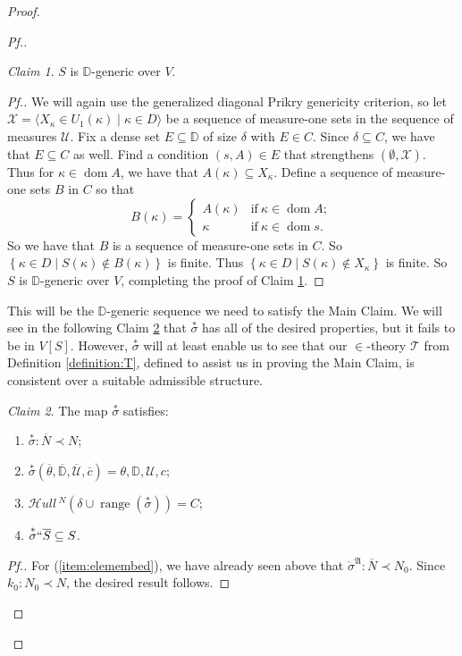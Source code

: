 \documentclass{amsart}
\theoremstyle{definition}
\theoremstyle{remark}
\newtheorem{claimno}{Claim}
\newcommand{\D}{\mathbb{D}}
\newcommand{\N}{{\overline{N}}}
\renewcommand{\S}{{\overline{S}}}
\newcommand{\U}{\mathcal{U}}
\DeclareMathOperator{\ran}{range}
\DeclareMathOperator{\dom}{dom}
\newcommand{\st}{\; | \;}
\newcommand{\set}[2]{\left\{#1\st #2 \right\}}
\newcommand{\seq}[2]{\langle #1 \st #2 \rangle}
\newcommand{\SH}{\mathcal{H}\textit{ull} \,}
\newcommand{\sk}[3]{\SH^{#1}( {#2} \cup {\ran(#3)} ) }
\begin{document}
\begin{proof}
\begin{proof}[Pf.]
\begin{claimno} \label{claim:SisDgenericOverV} $S$ is $\D$-generic over $V$. \end{claimno}
\begin{proof}[Pf.]
We will again use the generalized diagonal Prikry genericity criterion, so let $\mathcal X = \seq{ X_\kappa \in U_1(\kappa) }{ \kappa \in D }$ be a sequence of measure-one sets in the sequence of measures $\U$. Fix a dense set $E \subseteq \D$ of size $\delta$ with $E \in C$. Since $\delta \subseteq C$, we have that $E \subseteq C$ as well. Find a condition $(s,A) \in E$ that strengthens $(\emptyset, \mathcal X)$. Thus for $\kappa \in \dom A$, we have that $A(\kappa) \subseteq X_\kappa$. Define a sequence of measure-one sets $B$ in $C$ so that 
$$B(\kappa) = \begin{cases} A(\kappa) &\text{if} \ \kappa \in \dom A; \\ \kappa &\text{if} \ \kappa \in \dom s. \end{cases}$$
So we have that $B$ is a sequence of measure-one sets in $C$. So $\set{ \kappa \in D }{S(\kappa) \notin B(\kappa) }$ is finite. Thus $\set{\kappa \in D}{ S(\kappa) \notin X_\kappa}$ is finite. So $S$ is $\D$-generic over $V$, completing the proof of Claim \ref{claim:SisDgenericOverV}.
\end{proof}

This will be the $\D$-generic sequence we need to satisfy the Main Claim. We will see in the following Claim \ref{claim:starsigmaisgood} that $\overset{*} \sigma$ has all of the desired properties, but it fails to be in $V[S]$. However, $\overset{*}{\sigma}$ will at least enable us to see that our $\in$-theory $\mathcal T$ from Definition \ref{definition:T}, defined to assist us in proving the Main Claim, is consistent over a suitable admissible structure.
\begin{claimno} \label{claim:starsigmaisgood} The map $\overset{*}{\sigma}$ satisfies:
\begin{enumerate}
	\item \label{item:elemembed} $\overset{*} {\sigma}: \N \prec N$;
	\item \label{item:rangematches} $\overset{*} {\sigma}(\overline \theta, \overline{\D}, \overline{\U}, \overline c)=\theta, \D, \U, c$;
	\item \label{item:skolemC} $\sk{N}{\delta}{\overset{*}{\sigma}} = C$;	
	\item \label{item:lifts} $\overset{*} {\sigma} `` \S \subseteq S$.
\end{enumerate}
\end{claimno}
\begin{proof}[Pf.]
For (\ref{item:elemembed}), we have already seen above that $\mathring \sigma^{\mathfrak A}: \N \prec N_0$. Since $k_0:N_0 \prec N$, the desired result follows.


\end{proof}
\end{proof}
\end{proof}
\end{document}

